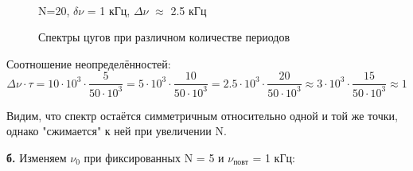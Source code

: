 \documentclass[a4paper,12pt]{article}
\begin{document}
\begin{enumerate}
\begin{figure}[h]
\begin{minipage}[h]{0.47\linewidth}
\end{minipage}
\hfill
\begin{minipage}[h]{0.47\linewidth}
 \\ N=20, $\delta \nu$ = 1 кГц, $\Delta \nu$ $\approx$ 2.5 кГц
\end{minipage}
\caption{Спектры цугов при различном количестве периодов}
\label{ris:experimentalcorrelationsignals3}
\end{figure}

Соотношение неопределённостей:
\[
\Delta \nu \cdot \tau = 10\cdot10^3\cdot\frac{5}{50\cdot10^3} = 5\cdot10^3\cdot\frac{10}{50\cdot10^3} = 2.5\cdot10^3\cdot\frac{20}{50\cdot10^3} \approx 3\cdot10^3\cdot\frac{15}{50\cdot10^3} \approx 1
\]

Видим, что спектр остаётся симметричным относительно одной и той же точки, однако "сжимается" к ней при увеличении N.

\newpage

\textbf{б.} Изменяем $\nu_0$ при фиксированных N = 5 и $\nu_\text{повт}$ = 1 кГц:


\end{enumerate}
\end{document}
